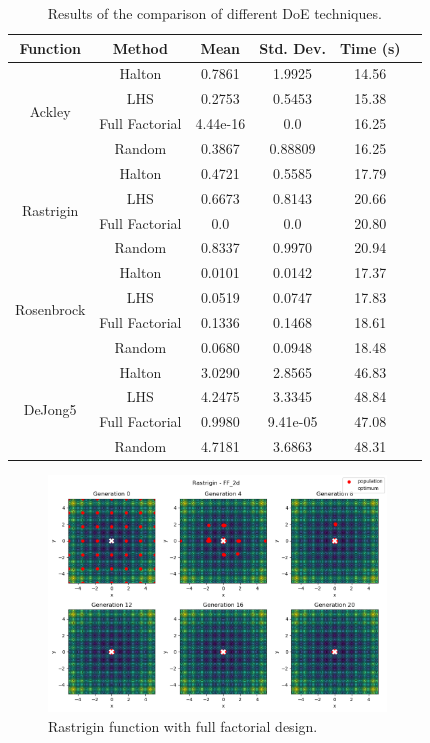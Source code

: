 \begin{table}[H]
    \centering
    \begin{tabular}{|c|c|c|c|c|c|}
        Function                    & Method         & Mean     & Std. Dev. & Time (s) \\ \hline
        \multirow{4}{*}{Ackley}     & Halton         & 0.7861   & 1.9925    & 14.56    \\
                                    & LHS            & 0.2753   & 0.5453    & 15.38    \\
                                    & Full Factorial & 4.44e-16 & 0.0       & 16.25    \\
                                    & Random         & 0.3867   & 0.88809   & 16.25    \\ \hline
        \multirow{4}{*}{Rastrigin}  & Halton         & 0.4721   & 0.5585    & 17.79    \\
                                    & LHS            & 0.6673   & 0.8143    & 20.66    \\
                                    & Full Factorial & 0.0      & 0.0       & 20.80    \\
                                    & Random         & 0.8337   & 0.9970    & 20.94    \\ \hline
        \multirow{4}{*}{Rosenbrock} & Halton         & 0.0101   & 0.0142    & 17.37    \\
                                    & LHS            & 0.0519   & 0.0747    & 17.83    \\
                                    & Full Factorial & 0.1336   & 0.1468    & 18.61    \\
                                    & Random         & 0.0680   & 0.0948    & 18.48    \\ \hline
        \multirow{4}{*}{DeJong5}    & Halton         & 3.0290   & 2.8565    & 46.83    \\
                                    & LHS            & 4.2475   & 3.3345    & 48.84    \\
                                    & Full Factorial & 0.9980   & 9.41e-05  & 47.08    \\
                                    & Random         & 4.7181   & 3.6863    & 48.31    \\ \hline
    \end{tabular}
    \caption{Results of the comparison of different DoE techniques.}
    \label{tab:doe-comparison}
\end{table}

\begin{figure}[H]
    \centering
    \includegraphics[width=0.8\textwidth]{lab9/imgs/doe_rastrigin.png}
    \caption{Rastrigin function with full factorial design.}
    \label{fig:doe-rastrigin}
\end{figure}